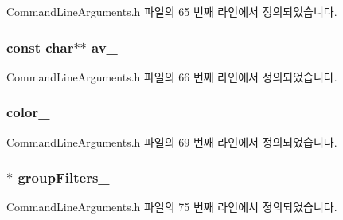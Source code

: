 Command\+Line\+Arguments.\+h 파일의 65 번째 라인에서 정의되었습니다.

\subsubsection[{\texorpdfstring{av\+\_\+}{av_}}]{\setlength{\rightskip}{0pt plus 5cm}const char$\ast$$\ast$ av\+\_\+\hspace{0.3cm}{\ttfamily [private]}}\hypertarget{class_command_line_arguments_aa1ce1557f3b793de10259ccce00a493f}{}\label{class_command_line_arguments_aa1ce1557f3b793de10259ccce00a493f}


Command\+Line\+Arguments.\+h 파일의 66 번째 라인에서 정의되었습니다.

\subsubsection[{\texorpdfstring{color\+\_\+}{color_}}]{ color\+\_\+\hspace{0.3cm}{\ttfamily [private]}}\hypertarget{class_command_line_arguments_adda8c1875964c3b80ed1c77b585fc756}{}\label{class_command_line_arguments_adda8c1875964c3b80ed1c77b585fc756}


Command\+Line\+Arguments.\+h 파일의 69 번째 라인에서 정의되었습니다.

\subsubsection[{\texorpdfstring{group\+Filters\+\_\+}{groupFilters_}}]{$\ast$ group\+Filters\+\_\+\hspace{0.3cm}{\ttfamily [private]}}\hypertarget{class_command_line_arguments_a0efdcaf4d54223caffe82738f5db8061}{}\label{class_command_line_arguments_a0efdcaf4d54223caffe82738f5db8061}


Command\+Line\+Arguments.\+h 파일의 75 번째 라인에서 정의되었습니다.

